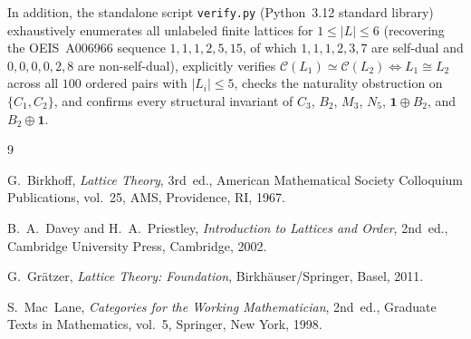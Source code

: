 \documentclass[11pt]{article}
\theoremstyle{definition}
\newcommand{\CatC}{\mathcal{C}}
\begin{document}
In addition, the standalone script \texttt{verify.py} (Python~3.12 standard
library) exhaustively enumerates all unlabeled finite lattices for $1 \le |L|
\le 6$ (recovering the OEIS~A006966 sequence $1, 1, 1, 2, 5, 15$, of which
$1, 1, 1, 2, 3, 7$ are self-dual and $0, 0, 0, 0, 2, 8$ are non-self-dual),
explicitly verifies $\CatC(L_1) \simeq \CatC(L_2) \iff L_1 \cong L_2$ across all
$100$ ordered pairs with $|L_i| \le 5$, checks the naturality obstruction on
$\{C_1, C_2\}$, and confirms every structural invariant of $C_3$, $B_2$, $M_3$,
$N_5$, $\mathbf{1} \oplus B_2$, and $B_2 \oplus \mathbf{1}$.

\begin{thebibliography}{9}

G.~Birkhoff, \emph{Lattice Theory}, 3rd~ed., American Mathematical Society
Colloquium Publications, vol.~25, AMS, Providence, RI, 1967.

B.~A.~Davey and H.~A.~Priestley, \emph{Introduction to Lattices and Order},
2nd~ed., Cambridge University Press, Cambridge, 2002.

G.~Gr\"atzer, \emph{Lattice Theory: Foundation}, Birkh\"auser/Springer, Basel,
2011.

S.~Mac~Lane, \emph{Categories for the Working Mathematician}, 2nd~ed., Graduate
Texts in Mathematics, vol.~5, Springer, New York, 1998.

\end{thebibliography}
\end{document}
